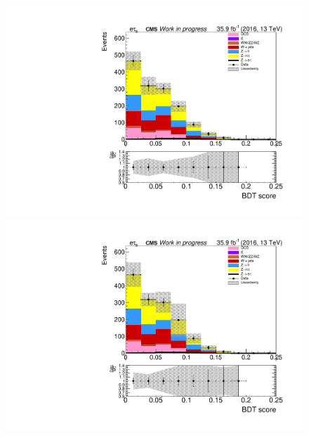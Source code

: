 \begin{figure}[htp]
	\begin{multicols}{2}
		\includegraphics[width=\linewidth]{plots/et/OneJet_prefit.pdf}\par 
		\includegraphics[width=\linewidth]{plots/et/OneJet_postfit.pdf}\par
	\end{multicols}
\end{figure}


